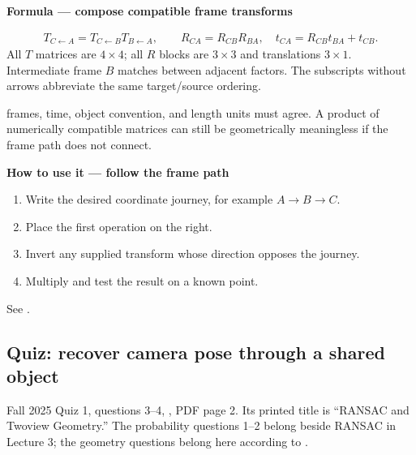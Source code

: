 \documentclass[letterpaper,11pt,english,openany,oneside]{jupyterBook}
\begin{document}
\begin{TextbookBox}
\textbf{Formula — compose compatible frame transforms}\par\smallskip
\begin{equation}\label{equation:lectures/lecture01/frames-quizzes:eq-lec01-compose}
\begin{split}T_{C\leftarrow A}=T_{C\leftarrow B}T_{B\leftarrow A},\qquad
R_{CA}=R_{CB}R_{BA},\quad t_{CA}=R_{CB}t_{BA}+t_{CB}.\end{split}
\end{equation}
\sphinxAtStartPar
All \(T\) matrices are \(4\times4\); all \(R\) blocks are \(3\times3\) and translations \(3\times1\). Intermediate frame \(B\) matches between adjacent factors. The subscripts without arrows abbreviate the same target/source ordering.

\sphinxAtStartPar
{} frames, time, object convention, and length units must agree. A product of numerically compatible matrices can still be geometrically meaningless if the frame path does not connect.

\end{TextbookBox}

\begin{TextbookBox}
\textbf{How to use it — follow the frame path}\par\smallskip
\begin{enumerate}
%
\item {}
\sphinxAtStartPar
Write the desired coordinate journey, for example \(A\to B\to C\).

\item {}
\sphinxAtStartPar
Place the first operation on the right.

\item {}
\sphinxAtStartPar
Invert any supplied transform whose direction opposes the journey.

\item {}
\sphinxAtStartPar
Multiply and test the result on a known point.

\end{enumerate}

\sphinxAtStartPar
See {\hyperref[\detokenize{lectures/lecture01/quiz-workbook:ex-lec01-relative-pose}]{}}.

\end{TextbookBox}


\subsection{Quiz: recover camera pose through a shared object}
\label{\detokenize{lectures/lecture01/frames-quizzes:quiz-recover-camera-pose-through-a-shared-object}}
\sphinxAtStartPar
{} Fall 2025 Quiz 1, questions 3–4, , PDF page 2. Its printed title is “RANSAC and Two\sphinxhyphen{}view Geometry.” The probability questions 1–2 belong beside RANSAC in Lecture 3; the geometry questions belong here according to .
\end{document}
